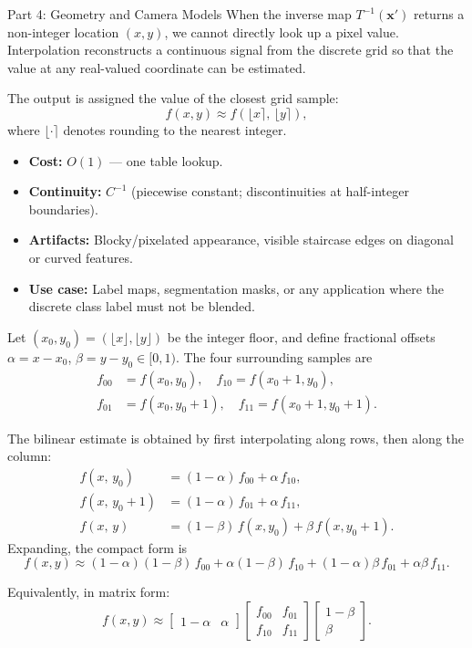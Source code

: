 \documentclass[letterpaper]{article}
\begin{document}
\begin{notes}{Part 4: Geometry and Camera Models}
When the inverse map $T^{-1}(\mathbf{x}')$ returns a non-integer location $(x,y)$, we cannot directly look up a pixel value. Interpolation reconstructs a continuous signal from the discrete grid so that the value at any real-valued coordinate can be estimated.


The output is assigned the value of the closest grid sample:
$$f(x,y) \approx f\!\left(\lfloor x\rceil,\, \lfloor y\rceil\right),$$
where $\lfloor\cdot\rceil$ denotes rounding to the nearest integer.
\begin{itemize}
    \item \textbf{Cost:} $O(1)$ — one table lookup.
    \item \textbf{Continuity:} $C^{-1}$ (piecewise constant; discontinuities at half-integer boundaries).
    \item \textbf{Artifacts:} Blocky/pixelated appearance, visible staircase edges on diagonal or curved features.
    \item \textbf{Use case:} Label maps, segmentation masks, or any application where the discrete class label must not be blended.
\end{itemize}


Let $(x_0, y_0) = (\lfloor x\rfloor, \lfloor y\rfloor)$ be the integer floor, and define fractional offsets $\alpha = x - x_0$, $\beta = y - y_0 \in [0,1)$. The four surrounding samples are
\begin{align*}
    f_{00}&=f(x_0,y_0),\quad f_{10}=f(x_0{+}1,y_0),\\
    f_{01}&=f(x_0,y_0{+}1),\quad f_{11}=f(x_0{+}1,y_0{+}1).
\end{align*}

The bilinear estimate is obtained by first interpolating along rows, then along the column:
\begin{align*}
    f(x,\,y_0)   &= (1-\alpha)\,f_{00} + \alpha\,f_{10}, \\
    f(x,\,y_0{+}1) &= (1-\alpha)\,f_{01} + \alpha\,f_{11}, \\
    f(x,\,y)      &= (1-\beta)\,f(x,y_0) + \beta\,f(x,y_0{+}1).
\end{align*}
Expanding, the compact form is
$$f(x,y) \approx (1{-}\alpha)(1{-}\beta)\,f_{00} + \alpha(1{-}\beta)\,f_{10} + (1{-}\alpha)\beta\,f_{01} + \alpha\beta\,f_{11}.$$


Equivalently, in matrix form:
$$f(x,y) \approx
\begin{bmatrix}1-\alpha & \alpha\end{bmatrix}
\begin{bmatrix}f_{00} & f_{01}\\ f_{10} & f_{11}\end{bmatrix}
\begin{bmatrix}1-\beta\\ \beta\end{bmatrix}.$$



\end{notes}
\end{document}
